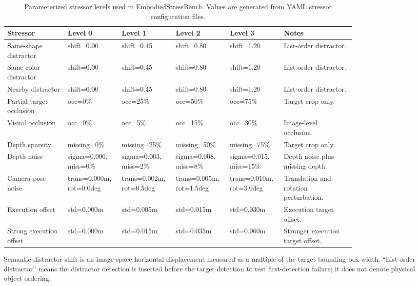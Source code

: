 \begin{table}[t]
\centering
\caption{Parameterized stressor levels used in EmbodiedStressBench. Values are generated from YAML stressor configuration files.}
\label{tab:stressor-parameters}
\tiny
\setlength{\tabcolsep}{2pt}
\begin{tabular}{@{}p{0.16\linewidth}p{0.12\linewidth}p{0.12\linewidth}p{0.12\linewidth}p{0.12\linewidth}p{0.19\linewidth}@{}}
\hline
Stressor & Level 0 & Level 1 & Level 2 & Level 3 & Notes \\
\hline
Same-shape distractor & shift=0.00 & shift=0.45 & shift=0.80 & shift=1.20 & List-order distractor. \\
Same-color distractor & shift=0.00 & shift=0.45 & shift=0.80 & shift=1.20 & List-order distractor. \\
Nearby distractor & shift=0.00 & shift=0.45 & shift=0.80 & shift=1.20 & List-order distractor. \\
Partial target occlusion & occ=0\% & occ=25\% & occ=50\% & occ=75\% & Target crop only. \\
Visual occlusion & occ=0\% & occ=5\% & occ=15\% & occ=30\% & Image-level occlusion. \\
Depth sparsity & missing=0\% & missing=25\% & missing=50\% & missing=75\% & Target crop only. \\
Depth noise & sigma=0.000, miss=0\% & sigma=0.003, miss=2\% & sigma=0.008, miss=8\% & sigma=0.015, miss=15\% & Depth noise plus missing depth. \\
Camera-pose noise & trans=0.000m, rot=0.0deg & trans=0.002m, rot=0.5deg & trans=0.005m, rot=1.5deg & trans=0.010m, rot=3.0deg & Translation and rotation perturbation. \\
Execution offset & std=0.000m & std=0.005m & std=0.015m & std=0.030m & Execution target offset. \\
Strong execution offset & std=0.000m & std=0.015m & std=0.035m & std=0.060m & Stronger execution target offset. \\
\hline
\end{tabular}
\begin{flushleft}\footnotesize Semantic-distractor shift is an image-space horizontal displacement measured as a multiple of the target bounding-box width. ``List-order distractor'' means the distractor detection is inserted before the target detection to test first-detection failure; it does not denote physical object ordering.\end{flushleft}
\end{table}

